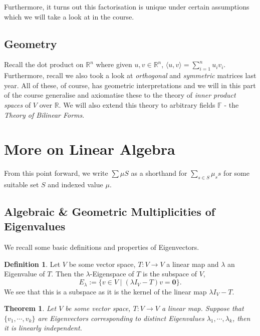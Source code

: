 \documentclass[
]{article}
\newtheorem{theorem}{Theorem}
\theoremstyle{definition}
\newtheorem{definition}{Definition}[section]
\begin{document}
Furthermore, it turns out this factorisation is unique under certain
assumptions which we will take a look at in the course.

\hypertarget{geometry}{%
\subsection{Geometry}\label{geometry}}

Recall the dot product on \(\mathbb{R}^n\) where given
\(u, v \in \mathbb{R}^n\),
\(\langle u, v \rangle = \sum_{i = 1}^n u_i v_i\). Furthermore, recall
we also took a look at \emph{orthogonal} and \emph{symmetric} matrices
last year. All of these, of course, has geometric interpretations and we
will in this part of the course generalise and axiomatise these to the
theory of \emph{inner product spaces} of \(V\) over \(\mathbb{R}\). We
will also extend this theory to arbitrary fields \(\mathbb{F}\) - the
\emph{Theory of Bilinear Forms}.

\newpage

\hypertarget{more-on-linear-algebra}{%
\section{More on Linear Algebra}\label{more-on-linear-algebra}}

From this point forward, we write \(\sum \mu S\) as a shorthand for
\(\sum_{s \in S} \mu_s s\) for some suitable set \(S\) and indexed value
\(\mu\).

\hypertarget{algebraic-geometric-multiplicities-of-eigenvalues}{%
\subsection{Algebraic \& Geometric Multiplicities of
Eigenvalues}\label{algebraic-geometric-multiplicities-of-eigenvalues}}

We recall some basic definitions and properties of Eigenvectors.

\begin{definition}
  Let \(V\) be some vector space, \(T : V \to V\) a linear map and \(\lambda\) 
  an Eigenvalue of \(T\). Then the \(\lambda\)-Eigenspace of \(T\) is the 
  subspace of \(V\),
  \[E_\lambda := \{ v \in V \mid (\lambda I_V - T)v = \mathbf{0} \}.\]
  We see that this is a subspace as it is the kernel of the linear map 
  \(\lambda I_V - T\).
\end{definition}

\begin{theorem}\label{eigen_li}
  Let \(V\) be some vector space, \(T : V \to V\) a linear map. Suppose that 
  \(\{v_1, \cdots, v_k\}\) are Eigenvectors corresponding to distinct 
  Eigenvalues \(\lambda_1, \cdots, \lambda_k\), then it is linearly independent.
\end{theorem}
\proof
\end{document}
